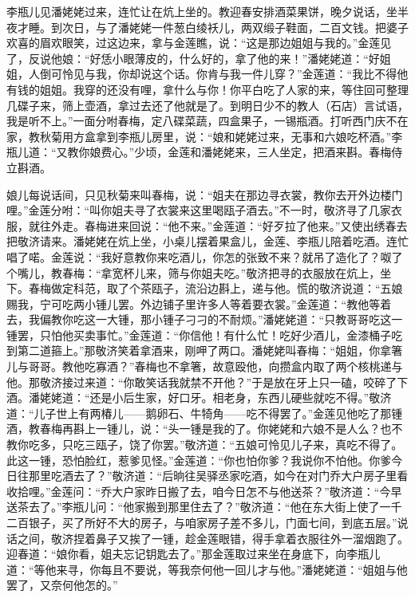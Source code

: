 李瓶儿见潘姥姥过来，连忙让在炕上坐的。教迎春安排酒菜果饼，晚夕说话，坐半夜才睡。到次日，与了潘姥姥一件葱白绫袄儿，两双缎子鞋面，二百文钱。把婆子欢喜的眉欢眼笑，过这边来，拿与金莲瞧，说：“这是那边姐姐与我的。”金莲见了，反说他娘：“好恁小眼薄皮的，什么好的，拿了他的来！”潘姥姥道：“好姐姐，人倒可怜见与我，你却说这个话。你肯与我一件儿穿？”金莲道：“我比不得他有钱的姐姐。我穿的还没有哩，拿什么与你！你平白吃了人家的来，等住回可整理几碟子来，筛上壶酒，拿过去还了他就是了。到明日少不的教人（石店）言试语，我是听不上。”一面分咐春梅，定八碟菜蔬，四盒果子，一锡瓶酒。打听西门庆不在家，教秋菊用方盒拿到李瓶儿房里，说：“娘和姥姥过来，无事和六娘吃杯酒。”李瓶儿道：“又教你娘费心。”少顷，金莲和潘姥姥来，三人坐定，把酒来斟。春梅侍立斟酒。

娘儿每说话间，只见秋菊来叫春梅，说：“姐夫在那边寻衣裳，教你去开外边楼门哩。”金莲分咐：“叫你姐夫寻了衣裳来这里喝瓯子酒去。”不一时，敬济寻了几家衣服，就往外走。春梅进来回说：“他不来。”金莲道：“好歹拉了他来。”又使出绣春去把敬济请来。潘姥姥在炕上坐，小桌儿摆着果盒儿，金莲、李瓶儿陪着吃酒。连忙唱了喏。金莲说：“我好意教你来吃酒儿，你怎的张致不来？就吊了造化了？呶了个嘴儿，教春梅：“拿宽杯儿来，筛与你姐夫吃。”敬济把寻的衣服放在炕上，坐下。春梅做定科范，取了个茶瓯子，流沿边斟上，递与他。慌的敬济说道：“五娘赐我，宁可吃两小锺儿罢。外边铺子里许多人等着要衣裳。”金莲道：“教他等着去，我偏教你吃这一大锺，那小锺子刁刁的不耐烦。”潘姥姥道：“只教哥哥吃这一锺罢，只怕他买卖事忙。”金莲道：“你信他！有什么忙！吃好少酒儿，金漆桶子吃到第二道箍上。”那敬济笑着拿酒来，刚呷了两口。潘姥姥叫春梅：“姐姐，你拿箸儿与哥哥。教他吃寡酒？”春梅也不拿箸，故意殴他，向攒盒内取了两个核桃递与他。那敬济接过来道：“你敢笑话我就禁不开他？”于是放在牙上只一磕，咬碎了下酒。潘姥姥道：“还是小后生家，好口牙。相老身，东西儿硬些就吃不得。”敬济道：“儿子世上有两椿儿——鹅卵石、牛犄角——吃不得罢了。”金莲见他吃了那锺酒，教春梅再斟上一锺儿，说：“头一锺是我的了。你姥姥和六娘不是人么？也不教你吃多，只吃三瓯子，饶了你罢。”敬济道：“五娘可怜见儿子来，真吃不得了。此这一锺，恐怕脸红，惹爹见怪。”金莲道：“你也怕你爹？我说你不怕他。你爹今日往那里吃酒去了？”敬济道：“后晌往吴驿丞家吃酒，如今在对门乔大户房子里看收拾哩。”金莲问：“乔大户家昨日搬了去，咱今日怎不与他送茶？”敬济道：“今早送茶去了。”李瓶儿问：“他家搬到那里住去了？”敬济道：“他在东大街上使了一千二百银子，买了所好不大的房子，与咱家房子差不多儿，门面七间，到底五层。”说话之间，敬济捏着鼻子又挨了一锺，趁金莲眼错，得手拿着衣服往外一溜烟跑了。迎春道：“娘你看，姐夫忘记钥匙去了。”那金莲取过来坐在身底下，向李瓶儿道：“等他来寻，你每且不要说，等我奈何他一回儿才与他。”潘姥姥道：“姐姐与他罢了，又奈何他怎的。”

